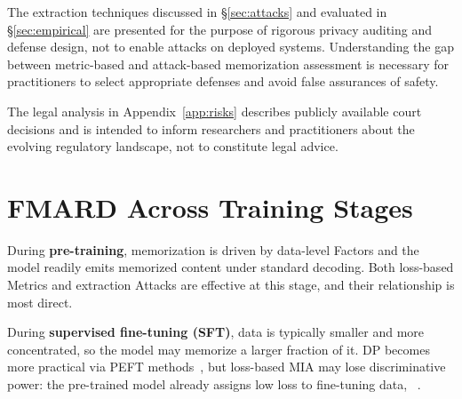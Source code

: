 \documentclass[11pt]{article}
\begin{document}
The extraction techniques discussed in \S\ref{sec:attacks} and evaluated in
\S\ref{sec:empirical} are presented for the purpose of rigorous privacy
auditing and defense design, not to enable attacks on deployed systems.
Understanding the gap between metric-based and attack-based memorization
assessment is necessary for practitioners to select appropriate defenses and
avoid false assurances of safety.

The legal analysis in Appendix~\ref{app:risks} describes publicly available
court decisions and is intended to inform researchers and practitioners about
the evolving regulatory landscape, not to constitute legal advice.




\newpage
\appendix

\section{FMARD Across Training Stages}
\label{app:training-stages}

During \textbf{pre-training}, memorization is driven by data-level Factors and
the model readily emits memorized content under standard decoding.
Both loss-based Metrics and extraction Attacks are effective at this stage,
and their relationship is most direct.

During \textbf{supervised fine-tuning (SFT)}, data is typically smaller and
more concentrated, so the model may memorize a larger fraction of it.
DP becomes more practical via PEFT methods~\citep{ma2024efficient}, but
loss-based MIA may lose discriminative power: the pre-trained model already
assigns low loss to fine-tuning data, ~\citep{duan2024membership}.
\end{document}
